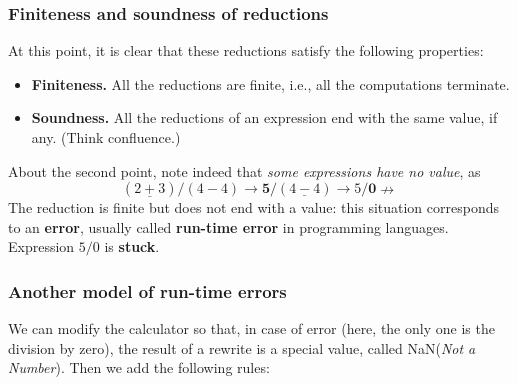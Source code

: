 \documentclass[compress,dvipdfmx]{beamer}
\newcommand{\NaN}{\textsf{NaN}\xspace}
\begin{document}
%
\begin{frame}
  \frametitle{Finiteness and soundness of reductions}

  At this point, it is clear that these reductions satisfy the
  following properties:
  \begin{itemize}

    \item \textbf{Finiteness.} All the reductions are finite, i.e.,
      all the computations terminate.

    \item \textbf{Soundness.} All the reductions of an expression end
      with the same value, if any. (Think confluence.)

  \end{itemize}

  About the second point, note indeed that \emph{some expressions have
  no value}, as
  \begin{equation*}
    (\underline{2+3})/(4-4) \rightarrow \textbf{5}/(\underline{4-4})
    \rightarrow 5/\textbf{0} \nrightarrow
  \end{equation*}
  The reduction is finite but does not end with a value: this
  situation corresponds to an \textbf{error}, usually called
  \textbf{run\hyp{}time error} in programming languages. Expression
  \(5/0\) is \textbf{stuck}.

\end{frame}


%
\begin{frame}
  \frametitle{Another model of run-time errors}

  We can modify the calculator so that, in case of error (here, the
  only one is the division by zero), the result of a rewrite is a
  special value, called \NaN (\emph{Not a Number}). Then we add the
  following rules:

\end{frame}
\end{document}
